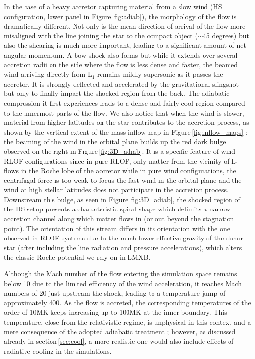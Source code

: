\documentclass{aa}
\makeatletter
\newcommand*{\lmxb}{LMXB\@\xspace}
\newcommand*{\rlof}{RLOF\@\xspace}
\makeatother
\begin{document}
In the case of a heavy accretor capturing material from a slow wind (HS configuration, lower panel in Figure\,\ref{fig:adiab}), the morphology of the flow is dramatically different. Not only is the mean direction of arrival of the flow more misaligned with the line joining the star to the compact object ($\sim$45 degrees) but also the shearing is much more important, leading to a significant amount of net angular momentum. A bow shock also forms but while it extends over several accretion radii on the side where the flow is less dense and faster, the beamed wind arriving directly from L$_1$ remains mildly supersonic as it passes the accretor. It is strongly deflected and accelerated by the gravitational slingshot but only to finally impact the shocked region from the back. The adiabatic compression it first experiences leads to a dense and fairly cool region compared to the innermost parts of the flow. We also notice that when the wind is slower, material from higher latitudes on the star contributes to the accretion process, as shown by the vertical extent of the mass inflow map in Figure\,\ref{fig:inflow_maps} : the beaming of the wind in the orbital plane builds up the red dark bulge observed on the right in Figure\,\ref{fig:3D_adiab}. It is a specific feature of wind \rlof configurations since in pure \rlof, only matter from the vicinity of L$_1$ flows in the Roche lobe of the accretor while in pure wind configurations, the centrifugal force is too weak to focus the fast wind in the orbital plane and the wind at high stellar latitudes does not participate in the accretion process. Downstream this bulge, as seen in Figure\,\ref{fig:3D_adiab}, the shocked region of the HS setup presents a characteristic spiral shape which delimits a narrow accretion channel along which matter flows in (or out beyond the stagnation point). The orientation of this stream differs in its orientation with the one observed in \rlof systems due to the much lower effective gravity of the donor star (after including the line radiation and pressure accelerations), which alters the classic Roche potential we rely on in \lmxb.

Although the Mach number of the flow entering the simulation space remains below 10 due to the limited efficiency of the wind acceleration, it reaches Mach numbers of 20 just upstream the shock, leading to a temperature jump of approximately 400. As the flow is accreted, the corresponding temperatures of the order of 10MK keeps increasing up to 100MK at the inner boundary. This temperature, close from the relativistic regime, is unphysical in this context and a mere consequence of the adopted adiabatic treatment ; however, as discussed already in section\,\ref{sec:cool}, a more realistic one would also include effects of radiative cooling in the simulations.
\end{document}

